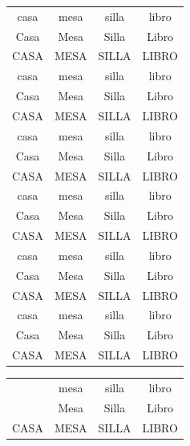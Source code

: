 \documentclass{report}
\begin{document}
\begin{longtable}[c]{c|c|c|c}
	casa & mesa & silla & libro \\
	Casa & Mesa & Silla & Libro \\
	CASA & MESA & SILLA & LIBRO \\
	casa & mesa & silla & libro \\
	Casa & Mesa & Silla & Libro \\
	CASA & MESA & SILLA & LIBRO \\
	casa & mesa & silla & libro \\
	Casa & Mesa & Silla & Libro \\
	CASA & MESA & SILLA & LIBRO \\
	casa & mesa & silla & libro \\
	Casa & Mesa & Silla & Libro \\
	CASA & MESA & SILLA & LIBRO \\
	casa & mesa & silla & libro \\
	Casa & Mesa & Silla & Libro \\
	CASA & MESA & SILLA & LIBRO \\
	casa & mesa & silla & libro \\
	Casa & Mesa & Silla & Libro \\
	CASA & MESA & SILLA & LIBRO \\
	\hline
\end{longtable}	
	
	
	
	
	
	
\newpage	
	
\begin{tabular}{|c|c|c|c|}
	\hline
\rowcolor{green} & mesa & silla & libro \\
\hhline{|>{\arrayrulecolor{green}}->{\arrayrulecolor{black}}|---}
\rowcolor{green} 	\multirow{-2}{*}{HOY}	 & Mesa & Silla & Libro \\
	CASA & MESA & SILLA & LIBRO \\
	\hline
\end{tabular}

\ \\[2cm]
	
\end{document}

